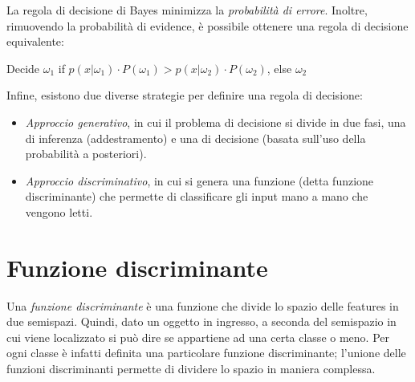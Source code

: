 \documentclass[a4paper,oneside,titlepage]{book}
\begin{document}
\noindent
La regola di decisione di Bayes minimizza la \textit{probabilità di errore}. Inoltre, rimuovendo la probabilità di evidence, è possibile ottenere una regola di decisione equivalente:
\begin{center}
    Decide $\omega_1$ if $p(x|\omega_1) \cdot P(\omega_1) > p(x|\omega_2) \cdot P(\omega_2)$, else $\omega_2$
\end{center}

\noindent
Infine, esistono due diverse strategie per definire una regola di decisione:
\begin{itemize}
    \item \textit{Approccio generativo}, in cui il problema di decisione si divide in due fasi, una di inferenza (addestramento) e una di decisione (basata sull'uso della probabilità a posteriori).
    \item \textit{Approccio discriminativo}, in cui si genera una funzione (detta funzione discriminante) che permette di classificare gli input mano a mano che vengono letti.
\end{itemize}

\section{Funzione discriminante}
Una \textit{funzione discriminante} è una funzione che divide lo spazio delle features in due semispazi. Quindi, dato un oggetto in ingresso, a seconda del semispazio in cui viene localizzato si può dire se appartiene ad una certa classe o meno. Per ogni classe è infatti definita una particolare funzione discriminante; l'unione delle funzioni discriminanti permette di dividere lo spazio in maniera complessa.
\end{document}
